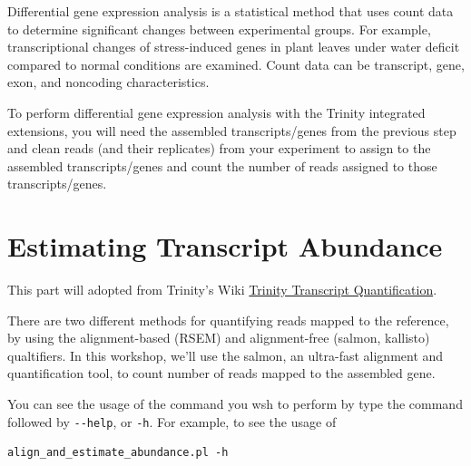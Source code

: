 \documentclass[
  letterpaper,
  DIV=11,
  numbers=noendperiod]{scrreprt}
\begin{document}
Differential gene expression analysis is a statistical method that uses
count data to determine significant changes between experimental groups.
For example, transcriptional changes of stress-induced genes in plant
leaves under water deficit compared to normal conditions are examined.
Count data can be transcript, gene, exon, and noncoding characteristics.

To perform differential gene expression analysis with the Trinity
integrated extensions, you will need the assembled transcripts/genes
from the previous step and clean reads (and their replicates) from your
experiment to assign to the assembled transcripts/genes and count the
number of reads assigned to those transcripts/genes.

\hypertarget{estimating-transcript-abundance}{%
\section{Estimating Transcript
Abundance}\label{estimating-transcript-abundance}}

This part will adopted from Trinity's Wiki
\href{https://github.com/trinityrnaseq/trinityrnaseq/wiki/Trinity-Transcript-Quantification}{Trinity
Transcript Quantification}.

There are two different methods for quantifying reads mapped to the
reference, by using the alignment-based (RSEM) and alignment-free
(salmon, kallisto) qualtifiers. In this workshop, we'll use the salmon,
an ultra-fast alignment and quantification tool, to count number of
reads mapped to the assembled gene.

\begin{tcolorbox}[enhanced jigsaw, breakable, bottomrule=.15mm, left=2mm, coltitle=black, opacityback=0, colframe=quarto-callout-tip-color-frame, toprule=.15mm, opacitybacktitle=0.6, colbacktitle=quarto-callout-tip-color!10!white, bottomtitle=1mm, colback=white, toptitle=1mm, titlerule=0mm, rightrule=.15mm, arc=.35mm, title=\textcolor{quarto-callout-tip-color}{\faLightbulb}\hspace{0.5em}{Tip}, leftrule=.75mm]

You can see the usage of the command you wsh to perform by type the
command followed by \texttt{-\/-help}, or \texttt{-h}. For example, to
see the usage of

\begin{verbatim}
align_and_estimate_abundance.pl -h
\end{verbatim}

\end{tcolorbox}
\end{document}
